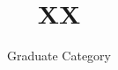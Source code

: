 \documentclass[sigconf,natbib=false,10pt]{acmart}
\begin{document}

\date{}

\title{XX}


\author{ Graduate Category } %


\maketitle









% 
\printbibliography

\end{document}
